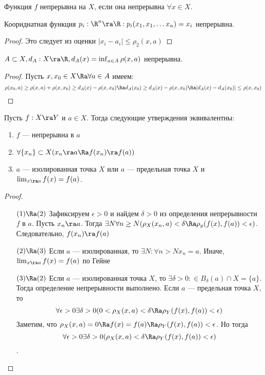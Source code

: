 \begin{definition}
    Функция \(f\) непрерывна на \(X\), если она непрерывна \(\forall x \in X\).
\end{definition}

\begin{example}
    Коориднатная функция \(p_i: \R^n \ra \R: p_i(x_1, x_1, \dots x_n) = x_i\) непрерывна.
\end{example}
\begin{proof}
    Это следует из оценки \(|x_i - a_i| \le \rho_2(x, a)\)
\end{proof}

\begin{example}
    \(A \subset X, d_A: X \ra \R, d_A(x) = \inf_{a \in A} \rho(x, a)\) непрерывна.
\end{example}
\begin{proof}
    Пусть \(x, x_0 \in X \Ra \forall a \in A\) имеем:
    \[\rho(x_0, a) \ge \rho(x, a) + \rho(x, x_0) \ge d_A(x) - \rho(x, x_0) \Ra d_A(x_0) \ge d_A(x) - \rho(x, x_0) \Ra |d_A(x) - d_A(x_0)| \le \rho(x, x_0)\]
\end{proof}

\begin{lemma}
    Пусть \(f: X \ra Y\) и \(a \in X\). Тогда следующие утверждения эквивалентны: 
    \begin{enumerate}
        \item \(f\) --- непрерывна в \(a\)
        \item \(\forall \{x_n\} \subset X (x_n \ra a \Ra f(x_n) \ra f(a))\)
        \item \(a\) --- изолированная точка \(X\) или \(a\) --- предельная точка \(X\) и \(\lim_{x \ra a}f(x) = f(a)\).
    \end{enumerate}
\end{lemma}
\begin{proof}\indent
    \begin{enumerate}
        \item[\((1) \Ra (2)\)] Зафиксируем \(\epsilon > 0\) и найдем \(\delta > 0\) из определения непрерывности \(f\) в \(a\). Пусть \(x_n \ra a\). Тогда \(\exists N \forall n \ge N (\rho_X(x_n, a) < \delta \Ra \rho_y(f(x), f(a)) < \epsilon)\). Следовательно, \(f(x_n) \ra f(a)\)
        \item[\((2) \Ra (3)\)] Если \(a\) --- изолированная, то \(\exists N: \forall n > N x_n = a\). Иначе, \(\lim_{x \ra a}f(x) = f(a)\) по Гейне
        \item[\((3) \Ra (2)\)] Если \(a\) --- изолированная точка \(X\), то \(\exists \delta > 0: \in B_\delta(a) \cap X = \{a\}\). Тогда определение непрерывности выполнено. Если \(a\) --- предельная точка \(X\), то 
        \[\forall \epsilon > 0 \exists \delta > 0 (0 < \rho_X(x, a) < \delta \Ra \rho_Y(f(x), f(a)) < \epsilon)\]
        Заметим, что \(\rho_X(x, a) = 0 \Ra f(x) = f(a) \Ra \rho_Y(f(x), f(a)) < \epsilon\). Но тогда 
        \[\forall \epsilon > 0 \exists \delta > 0 (\rho_X(x, a) < \delta \Ra \rho_Y(f(x), f(a)) < \epsilon)\].
    \end{enumerate}
\end{proof}

